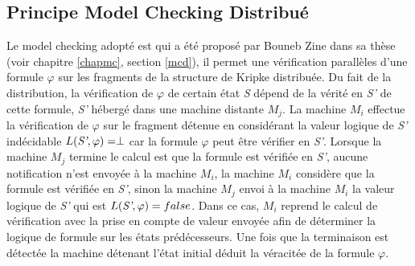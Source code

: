 
\subsection{Principe Model Checking Distribu\'{e}}
 
Le model checking adopté est qui a été  propos\'{e} par Bouneb Zine dans sa thèse \citep{depriester2011bouneb} (voir chapitre \ref{chapmc}, section \ref{mcd}), il permet une vérification parallèles d’une formule $\varphi$  sur les fragments de la structure de Kripke distribuée. Du fait de la distribution, la vérification de $\varphi$ de certain état \emph{S} dépend de la vérité en \emph{S’} de cette formule, \emph{S’}  hébergé dans une  machine distante $M_j$. La machine $M_i$ effectue la vérification de $\varphi$ sur le fragment détenue en considérant la valeur logique de \emph{S’} indécidable  $L (\emph{S’},\varphi )=\perp$ car la formule $\varphi$ peut être vérifier en \emph{S’}. Lorsque la machine $M_j$ termine le calcul est que la formule est vérifiée en \emph{S’}, aucune notification n'est envoyée à la machine $M_i$, la machine $M_i$ considère que la formule est vérifiée en \emph{S’}, sinon la machine $M_j$ envoi à la machine $M_i$ la valeur logique de \emph{S’} qui est $L(\emph{S’}, \varphi) =false$. Dans ce cas, $M_i$ reprend le calcul de vérification avec la prise en compte de valeur envoyée afin de déterminer la logique de formule sur les états prédécesseurs. Une fois que la terminaison est détectée  la machine détenant l’état initial déduit la véracitée de la formule $\varphi$.

